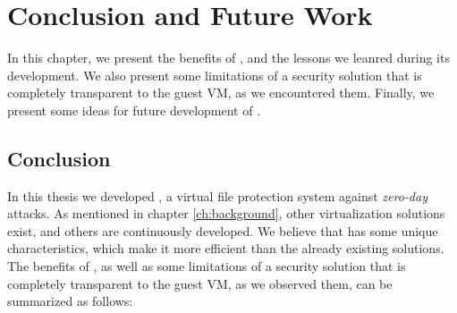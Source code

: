 
\chapter{Conclusion and Future Work}\label{ch:chapter5}

\par In this chapter, we present the benefits of , and the lessons we leanred during its development. We also present some limitations of a security solution that is completely transparent to the guest \ac{VM}, as we encountered them. Finally, we present some ideas for future development of .

\section{Conclusion}

\par In this thesis we developed , a virtual file protection system against \emph{zero-day} attacks. As mentioned in chapter \ref{ch:background}, other virtualization solutions exist, and others are continuously developed. We believe that  has some unique characteristics, which make it more efficient than the already existing solutions. The benefits of , as well as some limitations of a security solution that is completely transparent to the guest \ac{VM}, as we observed them, can be summarized as follows:

